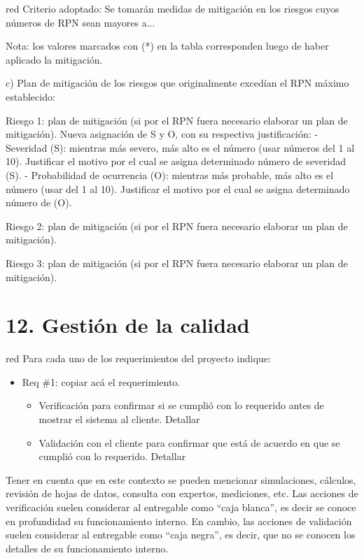 \documentclass[
11pt, %
codirector, %
]{charter}
\begin{document}
\begin{consigna}{red}
Criterio adoptado: 
Se tomarán medidas de mitigación en los riesgos cuyos números de RPN sean mayores a...

Nota: los valores marcados con (*) en la tabla corresponden luego de haber aplicado la mitigación.

c) Plan de mitigación de los riesgos que originalmente excedían el RPN máximo establecido:
 
Riesgo 1: plan de mitigación (si por el RPN fuera necesario elaborar un plan de mitigación).
  Nueva asignación de S y O, con su respectiva justificación:
  - Severidad (S): mientras más severo, más alto es el número (usar números del 1 al 10).
          Justificar el motivo por el cual se asigna determinado número de severidad (S).
  - Probabilidad de ocurrencia (O): mientras más probable, más alto es el número (usar del 1 al 10).
          Justificar el motivo por el cual se asigna determinado número de (O).

Riesgo 2: plan de mitigación (si por el RPN fuera necesario elaborar un plan de mitigación).
 
Riesgo 3: plan de mitigación (si por el RPN fuera necesario elaborar un plan de mitigación).

\end{consigna}


\section{12. Gestión de la calidad}
\label{sec:calidad}

\begin{consigna}{red}
Para cada uno de los requerimientos del proyecto indique:
\begin{itemize} 
\item Req \#1: copiar acá el requerimiento.

\begin{itemize}
	\item Verificación para confirmar si se cumplió con lo requerido antes de mostrar el sistema al cliente. Detallar 
	\item Validación con el cliente para confirmar que está de acuerdo en que se cumplió con lo requerido. Detallar  
\end{itemize}

\end{itemize}

Tener en cuenta que en este contexto se pueden mencionar simulaciones, cálculos, revisión de hojas de datos, consulta con expertos, mediciones, etc.  Las acciones de verificación suelen considerar al entregable como ``caja blanca'', es decir se conoce en profundidad su funcionamiento interno.  En cambio, las acciones de validación suelen considerar al entregable como ``caja negra'', es decir, que no se conocen los detalles de su funcionamiento interno.

\end{consigna}
\end{document}
